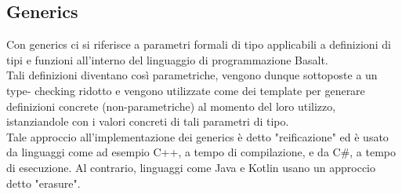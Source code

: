 \subsection{Generics}
Con generics ci si riferisce a parametri formali di tipo applicabili a definizioni di tipi e
funzioni all’interno del linguaggio di programmazione Basalt. \\

Tali definizioni diventano così parametriche, vengono dunque sottoposte a un type-
checking ridotto e vengono utilizzate come dei template per generare definizioni concrete
(non-parametriche) al momento del loro utilizzo, istanziandole con i valori concreti di tali
parametri di tipo. \\

Tale approccio all’implementazione dei generics è detto "reificazione" ed è usato da
linguaggi come ad esempio C++, a tempo di compilazione, e da C\#, a tempo di esecuzione. Al 
contrario, linguaggi come Java e Kotlin usano un approccio detto "erasure".






\newpage

